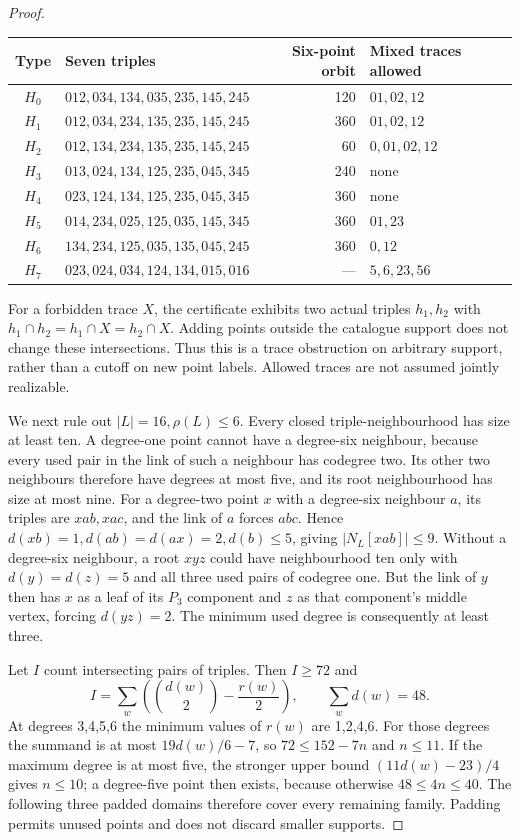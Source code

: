 \documentclass[11pt,a4paper]{article}
\numberwithin{equation}{section}
\theoremstyle{remark}
\begin{document}
\begin{proof}
\begin{center}\small
\begin{tabular}{c l r l}\toprule
Type&Seven triples&Six-point orbit&Mixed traces allowed\\\midrule
$ H_0$&$012,034,134,035,235,145,245$&120&$01,02,12$\\
$ H_1$&$012,034,234,135,235,145,245$&360&$01,02,12$\\
$ H_2$&$012,134,234,135,235,145,245$&60&$0,01,02,12$\\
$ H_3$&$013,024,134,125,235,045,345$&240&none\\
$ H_4$&$023,124,134,125,235,045,345$&360&none\\
$ H_5$&$014,234,025,125,035,145,345$&360&$01,23$\\
$ H_6$&$134,234,125,035,135,045,245$&360&$0,12$\\
$ H_7$&$023,024,034,124,134,015,016$&---&$5,6,23,56$\\\bottomrule
\end{tabular}
\end{center}
For a forbidden trace $ X $, the certificate exhibits two actual triples
$ h_1,h_2$ with $ h_1\cap h_2=h_1\cap X=h_2\cap X $. Adding points outside
the catalogue support does not change these intersections. Thus this is
a trace obstruction on arbitrary support, rather than a cutoff on new
point labels. Allowed traces are not assumed jointly realizable.

We next rule out $|L|=16,\rho(L)\le 6$. Every closed triple-neighbourhood
has size at least ten. A degree-one point cannot have a degree-six
neighbour, because every used pair in the link of such a neighbour has
codegree two. Its other two neighbours therefore have degrees at most
five, and its root neighbourhood has size at most nine. For a degree-two
point $ x $ with a degree-six neighbour $ a $, its triples are $ xab,xac $,
and the link of $ a $ forces $ abc $. Hence
$ d(xb)=1,d(ab)=d(ax)=2,d(b)\le 5$, giving $|N_L[xab]|\le 9$.
Without a degree-six neighbour, a root $ xyz $ could have neighbourhood
ten only with $ d(y)=d(z)=5$ and all three used pairs of codegree one.
But the link of $ y $ then has $ x $ as a leaf of its $ P_3$ component and
$ z $ as that component's middle vertex, forcing $ d(yz)=2$.
The minimum used degree is consequently at least three.

Let $ I $ count intersecting pairs of triples. Then $ I\ge 72$ and
\[
 I=\sum_w\left(\binom{d(w)}2-\frac{r(w)}2\right),\qquad \sum_w d(w)=48.
\]
At degrees 3,4,5,6 the minimum values of $ r(w)$ are 1,2,4,6.
For those degrees the summand is at most $19d(w)/6-7$, so
$72\le 152-7n $ and $ n\le 11$. If the maximum degree is at most five,
the stronger upper bound $(11d(w)-23)/4$ gives $ n\le 10$; a degree-five
point then exists, because otherwise $48\le 4n\le 40$.
The following three padded domains therefore cover every remaining
family. Padding permits unused points and does not discard smaller
supports.


\end{proof}
\end{document}
